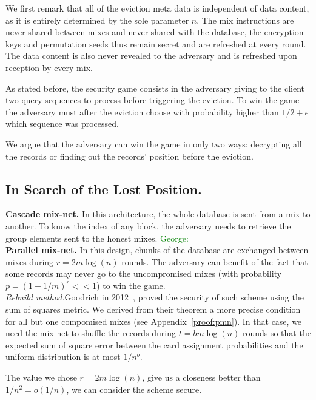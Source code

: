 \documentclass[USenglish,oneside,twocolumn]{article}
\newcommand{\george}[1]{\textcolor{green}{George: #1}}
\begin{document}
We first remark that all of the eviction meta data is independent of data content, as it is entirely determined by the sole parameter $n$. The mix instructions are never shared between mixes and never shared with the database, the encryption keys and permutation seeds thus remain secret and are refreshed at every round. The data content is also never revealed to the adversary and is refreshed upon reception by every mix.

As stated before, the security game consists in the adversary giving to the client two query sequences to process before triggering the eviction. To win the game the adversary must after the eviction choose with probability higher than $1/2 +\epsilon$ which sequence was processed.

We argue that the adversary can win the game in only two ways: decrypting all the records or finding out the records' position before the eviction. 

\subsection{In Search of the Lost Position.}

\noindent\textbf{Cascade mix-net.}
In this architecture, the whole database is sent from a mix to another. To know the index of any block, the adversary needs to retrieve the group elements sent to the honest mixes. \george{} \\

\noindent\textbf{Parallel mix-net.}
In this design, chunks of the database are exchanged between mixes during $r=2m\log(n)$ rounds. The adversary can benefit of the fact that some records may never go to the uncompromised mixes (with probability $p=(1-1/m)^r << 1$) to win the game.\\

\noindent\textit{Rebuild method.}Goodrich in 2012~\cite{goodrich2012anonymous}, proved the security of such scheme using the sum of squares metric. We derived from their theorem a more precise condition for all but one compomised mixes (see Appendix~\ref{proof:pmn}). In that case, we need the mix-net  to shuffle the records during $t=bm\log(n)$ rounds so that the expected sum of square error between the card assignment probabilities and the uniform distribution is at most $1/n^b$.

The value we chose $r=2m\log(n)$, give us a closeness better than $1/n^2 = o(1/n)$, we can consider the scheme secure.\\
\end{document}
